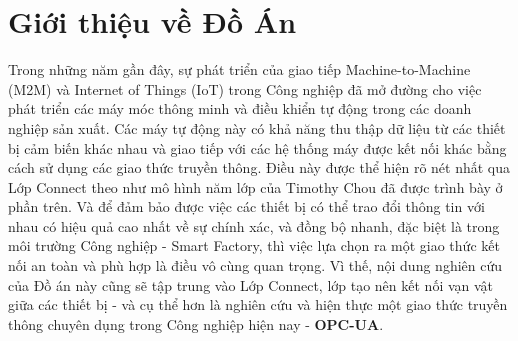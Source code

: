 

\section{Giới thiệu về Đồ Án}

Trong những năm gần đây, sự phát triển của giao tiếp Machine-to-Machine (M2M) và Internet of Things (IoT) trong Công nghiệp đã mở đường cho việc phát triển các máy móc thông minh và điều khiển tự động trong các doanh nghiệp sản xuất. Các máy tự động này có khả năng thu thập dữ liệu từ các thiết bị cảm biến khác nhau và giao tiếp với các hệ thống máy được kết nối khác bằng cách sử dụng các giao thức truyền thông. Điều này được thể hiện rõ nét nhất qua Lớp Connect theo như mô hình năm lớp của Timothy Chou đã được trình bày ở phần trên. Và để đảm bảo được việc các thiết bị có thể trao đổi thông tin với nhau có hiệu quả cao nhất về sự chính xác, và đồng bộ nhanh, đặc biệt là trong môi trường Công nghiệp - Smart Factory, thì việc lựa chọn ra một giao thức kết nối an toàn và phù hợp là điều vô cùng quan trọng. Vì thế, nội dung nghiên cứu của Đồ án này cũng sẽ tập trung vào Lớp Connect, lớp tạo nên kết nối vạn vật giữa các thiết bị - và cụ thể hơn là nghiên cứu và hiện thực một giao thức truyền thông chuyên dụng trong Công nghiệp hiện nay - \textbf{OPC-UA}. 

